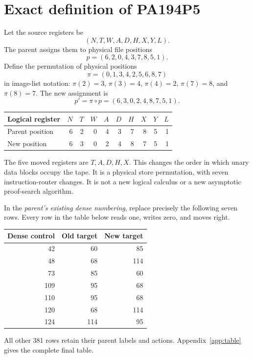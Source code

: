 \documentclass[11pt,letterpaper]{article}
\begin{document}
\section{Exact definition of PA194P5}

Let the source registers be
\[
                    (N,T,W,A,D,H,X,Y,L).
\]
The parent assigns them to physical file positions
\[
                    p=(6,2,0,4,3,7,8,5,1).
\]
Define the permutation of physical positions
\[
       \pi=(0,1,3,4,2,5,6,8,7)
\]
in image-list notation: $\pi(2)=3$, $\pi(3)=4$, $\pi(4)=2$,
$\pi(7)=8$, and $\pi(8)=7$. The new assignment is
\[
                    p'=\pi\circ p=(6,3,0,2,4,8,7,5,1).
\]

\begin{center}
\begin{tabular}{@{}lrrrrrrrrr@{}}
\toprule Logical register & $N$&$T$&$W$&$A$&$D$&$H$&$X$&$Y$&$L$\\
\midrule Parent position &6&2&0&4&3&7&8&5&1\\
New position &6&3&0&2&4&8&7&5&1\\
\bottomrule
\end{tabular}
\end{center}

The five moved registers are $T,A,D,H,X$. This changes the order in
which unary data blocks occupy the tape. It is a physical store
permutation, with seven instruction-router changes. It is not a
new logical calculus or a new asymptotic proof-search algorithm.

In the \emph{parent's existing dense numbering}, replace precisely
the following seven rows. Every row in the table below reads one,
writes zero, and moves right.
\begin{center}
\begin{tabular}{@{}rrr@{}}
\toprule Dense control & Old target & New target\\\midrule
42&60&85\\
48&68&114\\
73&85&60\\
109&95&68\\
110&95&68\\
120&68&114\\
124&114&95\\
\bottomrule
\end{tabular}
\end{center}
All other 381 rows retain their parent labels and actions.
Appendix~\ref{app:table} gives the complete final table.
\end{document}
